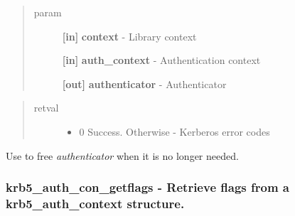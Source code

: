 \documentclass[letterpaper,10pt,english]{sphinxmanual}
\begin{document}
\begin{fulllineitems}
\label{appdev/refs/api/krb5_auth_con_getauthenticator:c.krb5_auth_con_getauthenticator}
\end{fulllineitems}

\begin{quote}\begin{description}
\item[{param}] \leavevmode
\textbf{{[}in{]}} \textbf{context} - Library context

\textbf{{[}in{]}} \textbf{auth\_context} - Authentication context

\textbf{{[}out{]}} \textbf{authenticator} - Authenticator

\end{description}\end{quote}
\begin{quote}\begin{description}
\item[{retval}] \leavevmode\begin{itemize}
\item {} 
0   Success. Otherwise - Kerberos error codes

\end{itemize}

\end{description}\end{quote}

Use {\hyperref[appdev/refs/api/krb5_free_authenticator:c.krb5_free_authenticator]{}} to free \emph{authenticator} when it is no longer needed.


\subsubsection{krb5\_auth\_con\_getflags -  Retrieve flags from a krb5\_auth\_context structure.}
\label{appdev/refs/api/krb5_auth_con_getflags:krb5-auth-con-getflags-retrieve-flags-from-a-krb5-auth-context-structure}\label{appdev/refs/api/krb5_auth_con_getflags::doc}
\end{document}
